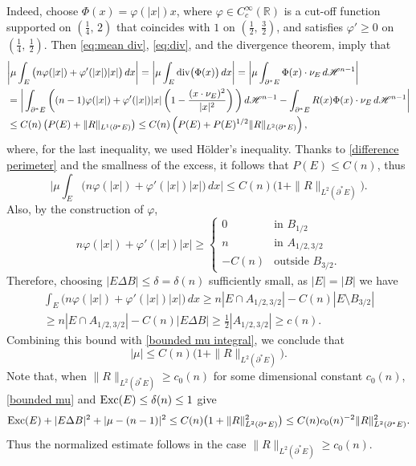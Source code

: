 \documentclass[reqno,11pt]{amsart}
\newcommand{\R}{\mathbb R}
\numberwithin{equation}{section}
\theoremstyle{remark}
\begin{document}
Indeed, 
choose $\Phi(x)=\varphi(|x|)x$,
where $\varphi \in C^\infty_c(\R)$ is a cut-off function supported on $\left(\frac 1 4,\, 2\right)$ that coincides with $1$ on $\left(\frac 1 2,\, \frac3 2\right)$, and satisfies
$\varphi'\ge 0$  on $\left(\frac 1 4,\, \frac 1 2\right)$.
Then \eqref{eq:mean div}, \eqref{eq:div}, and the divergence theorem, imply that
\begin{align*}
&\bigg|\mu \int_{E} \big( n\varphi(|x|) +\varphi'(|x|) |x| \big)\,dx\bigg| =\bigg|\mu \int_{E} {\rm div}\big(\Phi(x)\big) \,dx\bigg|=\bigg| \mu \int_{\partial^*E}  \Phi(x)\cdot \nu_E \,d\mathscr H^{n-1}\bigg|\\
&=\bigg| \int_{\partial^*E}  \bigg((n-1) \varphi(|x|) + \varphi'(|x|)|x| \left(1-\frac{(x\cdot \nu_E)^2}{|x|^2}\right) \bigg)\,d\mathscr H^{n-1} - \int_{\partial^*E} R(x)  \Phi(x)\cdot \nu_E \,d\mathscr H^{n-1} \bigg|\\
&\leq C(n)\left(P(E) + \|R\|_{L^1(\partial^*E)}\right)\leq C(n)\left(P(E) + P(E)^{1/2}\|R\|_{L^2(\partial^*E)}\right),
\end{align*}
where, for the last inequality, we used H\"older's inequality.
Thanks to \eqref{difference perimeter} and the smallness of the excess, it follows that $P(E)\leq C(n)$, thus
\begin{equation}\label{bounded mu integral}
\bigg|\mu \int_{E} \big( n\varphi(|x|) +\varphi'(|x|) |x| \big)\,dx\bigg| \leq C(n)\big(1+\|R\|_{L^2(\partial^*E)}\big).
\end{equation}
Also, by the construction of $\varphi$, 
$$
n\varphi(|x|) +\varphi'(|x|) |x|\geq \left\{
\begin{array}{ll}
0&\text{in }B_{1 /2}\\
n&\text{in }A_{1 /2 , 3 /2}\\
-C(n)&\text{outside }B_{3/ 2}.
\end{array}
\right.
$$
Therefore, choosing $|E\Delta B|\le \delta=\delta(n)$ sufficiently small, as $|E|=|B|$ we have
\begin{multline*}
\int_{E} \big( n\varphi(|x|) +\varphi'(|x|) |x| \big)\,dx \geq n\left|E\cap A_{1/2,3/2}\right|-C(n)|E\setminus  B_{3/2}| \\
 \geq n\left|E\cap A_{1/2,3/2}\right|-C(n)|E\Delta B| \ge \frac 1 2  \left|A_{1/2,3/2}\right|\ge c(n).
\end{multline*}
Combining this bound with \eqref{bounded mu integral}, we conclude that 
\begin{equation}\label{bounded mu}
|\mu|\le C(n) \big(1+\|R\|_{L^2(\partial^*E)}\big).
\end{equation}
Note that, when $\|R\|_{L^2(\partial^*E)} \geq c_0(n)$ for some dimensional
constant $c_0(n)$, \eqref{bounded mu} and ${\rm Exc}(E)\le\delta(n)\le1$ give
\[
{\rm Exc}(E)+|E\Delta B|^2+|\mu-(n-1)|^2
\le C(n)\bigl(1+\|R\|_{L^2(\partial^*E)}^2\bigr)
\le C(n)c_0(n)^{-2}\|R\|_{L^2(\partial^*E)}^2 .
\]
Thus the normalized estimate follows in the case
$\|R\|_{L^2(\partial^*E)} \geq c_0(n)$.
\end{document}

